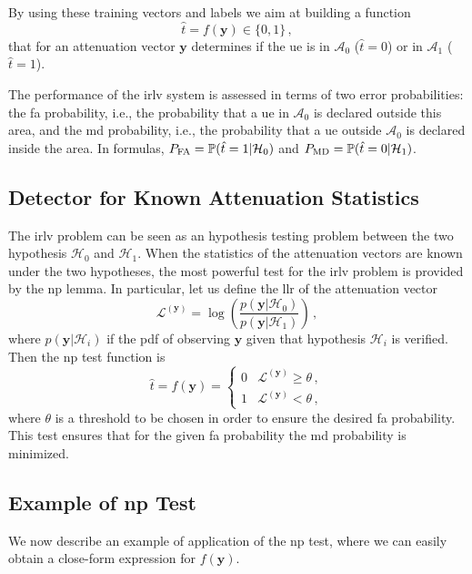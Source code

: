 \documentclass[conference,draftcls,onecolumn]{IEEEtran}
\begin{document}
By using these training vectors and labels we aim at building a function
\begin{equation}
    \hat{t} = f(\bm{y}) \in \{0,1\}\,,
\end{equation}
that for an attenuation vector $\bm{y}$ determines if the \ac{ue} is in $\mathcal A_0$ ($\hat{t}=0$) or in $\mathcal A_1$ ($\hat{t}=1$).

The performance of the \ac{irlv} system is assessed in terms of two error probabilities: the \ac{fa} probability, i.e., the probability  that a \ac{ue} in $\mathcal A_0$ is declared outside this area, and the \ac{md} probability, i.e., the probability that a \ac{ue} outside $\mathcal A_0$ is declared inside the area. In formulas, $P_{\rm FA} ={\mathbb P}(\hat{t} =1 | \mathcal H_0)$ and  $P_{\rm MD}={\mathbb P}(\hat{t} = 0 | \mathcal H_1)$.

\subsection{Detector for Known Attenuation Statistics}

The \ac{irlv} problem can be seen as an hypothesis testing problem between the two hypothesis $\mathcal H_0$ and $\mathcal H_1$. When the statistics of the attenuation vectors are known under the two hypotheses, the most powerful test for the \ac{irlv} problem is provided by the \ac{np} lemma. In particular, let us  define the \ac{llr} of the attenuation vector
\begin{equation}\label{eq:lr}
    \mathcal{L}^{(\bm{y})}=\log\left(\frac{p(\bm{y}|\mathcal{H}_0)}{p(\bm{y}|\mathcal{H}_1)}\right)\,,
\end{equation}
where $p(\bm{y}|\mathcal{H}_i)$ if the \ac{pdf} of observing $\bm{y}$ given that hypothesis $\mathcal H_i$ is verified. Then the \ac{np} test function is 
\begin{equation}
\label{eq:thrOpt}
    \hat{t} = f(\bm{y}) = \begin{cases}
    0 & \mathcal{L}^{(\bm{y})} \geq \theta\,, \\ 
    1 & \mathcal{L}^{(\bm{y})} < \theta\,, 
    \end{cases}
\end{equation}
where $\theta$ is a threshold to be chosen in order to ensure the desired \ac{fa} probability. This test ensures that for the given \ac{fa} probability the \ac{md} probability is minimized. 

\subsection{Example of \ac{np} Test}
\label{sec:los}
We now describe an example of application of the \ac{np} test, where we can easily obtain a close-form expression for $f(\bm{y})$. 
\end{document}
